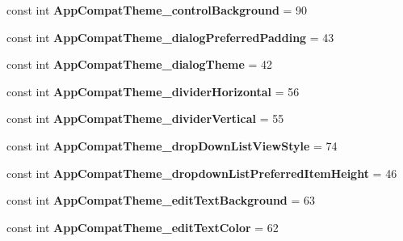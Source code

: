 \begin{DoxyCompactItemize}
\item 
\mbox{\label{classXaria_1_1Resource_1_1Styleable_a986f612b21ac5a11b581e944ef0ddadb}} 
const int {\bfseries App\+Compat\+Theme\+\_\+control\+Background} = 90
\item 
\mbox{\label{classXaria_1_1Resource_1_1Styleable_acac40e87f3e0749ca0769e8c38a5bd37}} 
const int {\bfseries App\+Compat\+Theme\+\_\+dialog\+Preferred\+Padding} = 43
\item 
\mbox{\label{classXaria_1_1Resource_1_1Styleable_ac368530e8e270ab0ae9a36b90078155b}} 
const int {\bfseries App\+Compat\+Theme\+\_\+dialog\+Theme} = 42
\item 
\mbox{\label{classXaria_1_1Resource_1_1Styleable_a2ccd3fb4a550ae184690dc5a7d6237bb}} 
const int {\bfseries App\+Compat\+Theme\+\_\+divider\+Horizontal} = 56
\item 
\mbox{\label{classXaria_1_1Resource_1_1Styleable_a03cc3412e0b78a828a64b940282252ed}} 
const int {\bfseries App\+Compat\+Theme\+\_\+divider\+Vertical} = 55
\item 
\mbox{\label{classXaria_1_1Resource_1_1Styleable_ac0efa71a1b2e6c5a3096c45a5ced466d}} 
const int {\bfseries App\+Compat\+Theme\+\_\+drop\+Down\+List\+View\+Style} = 74
\item 
\mbox{\label{classXaria_1_1Resource_1_1Styleable_a40425f49c8fe82af10b09331e4e2c134}} 
const int {\bfseries App\+Compat\+Theme\+\_\+dropdown\+List\+Preferred\+Item\+Height} = 46
\item 
\mbox{\label{classXaria_1_1Resource_1_1Styleable_a419e4a9cf2dd588b0faf5395f4e27fcf}} 
const int {\bfseries App\+Compat\+Theme\+\_\+edit\+Text\+Background} = 63
\item 
\mbox{\label{classXaria_1_1Resource_1_1Styleable_a22f5b520dc203b5d9215e5009e90707d}} 
const int {\bfseries App\+Compat\+Theme\+\_\+edit\+Text\+Color} = 62

\end{DoxyCompactItemize}

